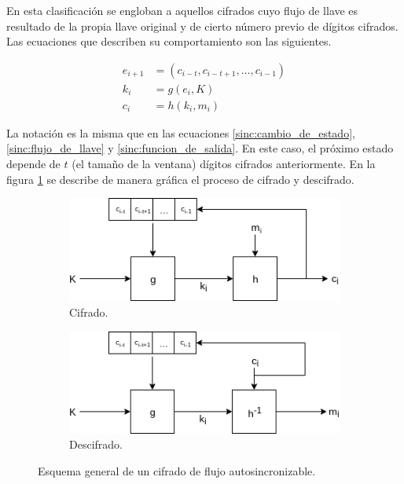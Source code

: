 En esta clasificación se engloban a aquellos cifrados cuyo flujo de llave es
resultado de la propia llave original y de cierto número previo de dígitos
cifrados. Las ecuaciones que describen su comportamiento son las siguientes.

\begin{align}
  \label{asinc:cambio_de_estado}
  e_{i+1} &= (c_{i - t}, c_{i - t + 1}, \dots, c_{i - 1}) \\
  \label{asinc:flujo_de_llave}
  k_i &= g(e_i, K) \\
  \label{asinc:funcion_de_salida}
  c_i &= h(k_i, m_i)
\end{align}

La notación es la misma que en las ecuaciones \ref{sinc:cambio_de_estado},
\ref{sinc:flujo_de_llave} y \ref{sinc:funcion_de_salida}. En este caso, el
próximo estado depende de $ t $ (el tamaño de la ventana) dígitos cifrados
anteriormente. En la figura \ref{flujo_asincrono} se describe de manera
gráfica el proceso de cifrado y descifrado.

\begin{figure}[H]
  \centering
  \begin{subfigure}{0.45\textwidth}
    \begin{center}
      \includegraphics[width=0.9\linewidth]{diagramas/asincrono_cifrado.png}
      \caption{Cifrado.}
    \end{center}
  \end{subfigure}
  \begin{subfigure}{0.45\textwidth}
    \begin{center}
      \includegraphics[width=0.9\linewidth]{diagramas/asincrono_descifrado.png}
      \caption{Descifrado.}
    \end{center}
  \end{subfigure}
  \caption{Esquema general de un cifrado de flujo autosincronizable.}
  \label{flujo_asincrono}
\end{figure}

